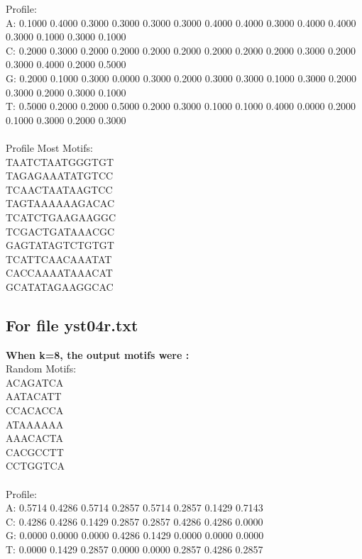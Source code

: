 \documentclass{report}
\begin{document}
Profile:\\
A: 0.1000 0.4000 0.3000 0.3000 0.3000 0.3000 0.4000 0.4000 0.3000 0.4000 0.4000 0.3000 0.1000 0.3000 0.1000\\
C: 0.2000 0.3000 0.2000 0.2000 0.2000 0.2000 0.2000 0.2000 0.2000 0.3000 0.2000 0.3000 0.4000 0.2000 0.5000\\
G: 0.2000 0.1000 0.3000 0.0000 0.3000 0.2000 0.3000 0.3000 0.1000 0.3000 0.2000 0.3000 0.2000 0.3000 0.1000\\
T: 0.5000 0.2000 0.2000 0.5000 0.2000 0.3000 0.1000 0.1000 0.4000 0.0000 0.2000 0.1000 0.3000 0.2000 0.3000 \\
\\
Profile Most Motifs:\\
TAATCTAATGGGTGT\\
TAGAGAAATATGTCC\\
TCAACTAATAAGTCC\\
TAGTAAAAAAGACAC\\
TCATCTGAAGAAGGC\\
TCGACTGATAAACGC\\
GAGTATAGTCTGTGT\\
TCATTCAACAAATAT\\
CACCAAAATAAACAT\\
GCATATAGAAGGCAC\\


\subsection{For file yst04r.txt}
\textbf{When k=8, the output motifs were :}\\
Random Motifs:\\
ACAGATCA\\
AATACATT\\
CCACACCA\\
ATAAAAAA\\
AAACACTA\\
CACGCCTT\\
CCTGGTCA\\
\\
Profile:\\
A: 0.5714 0.4286 0.5714 0.2857 0.5714 0.2857 0.1429 0.7143\\
C: 0.4286 0.4286 0.1429 0.2857 0.2857 0.4286 0.4286 0.0000\\
G: 0.0000 0.0000 0.0000 0.4286 0.1429 0.0000 0.0000 0.0000\\
T: 0.0000 0.1429 0.2857 0.0000 0.0000 0.2857 0.4286 0.2857\\
\end{document}
